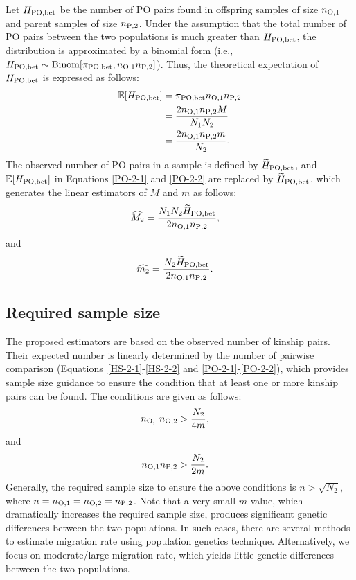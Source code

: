 \documentclass[12pt, English]{article}
\begin{document}
\begin{spacing}{1.9}
Let $H_{\rm PO,bet}$ be the number of PO pairs found in offspring samples of size $n_{\rm O, 1}$ and parent samples of size $n_{\rm P, 2}$. Under the assumption that the total number of PO pairs between the two populations is much greater than $H_{\rm PO,bet}$, the distribution is approximated by a binomial form (i.e., $H_{\rm PO,bet} \sim {\rm Binom}[\pi_{\rm PO,bet}, n_{\rm O, 1} n_{\rm P, 2}]$). Thus, the theoretical expectation of $H_{\rm PO,bet}$ is expressed as follows: 
\begin{align}
\mathbb{E}[H_{\rm PO, bet}] &= \pi_{\rm PO,bet} n_{\rm O, 1} n_{\rm P, 2} \nonumber\\
&= \frac{ 2 n_{\rm O, 1} n_{\rm P, 2} M } { N_{1} N_{2} } \label{PO-2-1} \\
&= \frac{ 2 n_{\rm O, 1} n_{\rm P, 2} m } { N_{2} }.
\label{PO-2-2}
\end{align}
The observed number of PO pairs in a sample is defined by $\widetilde{H}_{\rm PO, bet}$, and $\mathbb{E}[H_{\rm PO, bet}]$ in Equations \ref{PO-2-1} and \ref{PO-2-2} are replaced by $\widetilde{H}_{\rm PO, bet}$, which generates the linear estimators of $M$ and $m$ as follows:
\begin{align}
\widehat{M_2} &= \frac{N_{1} N_{2} \widetilde{H}_{\rm PO,bet} } {2 n_{\rm O, 1} n_{\rm P, 2} },
\label{PO-3}
\end{align}
and
\begin{align}
\widehat{m_2} &= \frac{N_{2} \widetilde{H}_{\rm PO,bet} } {2 n_{\rm O, 1} n_{\rm P, 2} }.
\label{PO-4}
\end{align}

\subsection{Required sample size}

The proposed estimators are based on the observed number of kinship pairs. Their expected number is linearly determined by the number of pairwise comparison (Equations~\ref{HS-2-1}-\ref{HS-2-2} and \ref{PO-2-1}-\ref{PO-2-2}), which provides sample size guidance to ensure the condition that at least one or more kinship pairs can be found. The conditions are given as follows: 
\begin{align}
n_{\rm O, 1} n_{\rm O, 2} &> \frac{ N_{2} } { 4m },
\label{RS-1}
\end{align}
and
\begin{align}
n_{\rm O, 1} n_{\rm P, 2} &> \frac{ N_{2} } { 2m }.
\label{RS-2}
\end{align}
Generally, the required sample size to ensure the above conditions is $n>\sqrt{N_2}$, where $n = n_{\rm O, 1}=n_{\rm O, 2}=n_{\rm P, 2}$. Note that a very small $m$ value, which dramatically increases the required sample size, produces significant genetic differences between the two populations. In such cases, there are several methods to estimate migration rate using population genetics technique. Alternatively, we focus on moderate/large migration rate, which yields little genetic differences between the two populations. 


\end{spacing}
\end{document}
